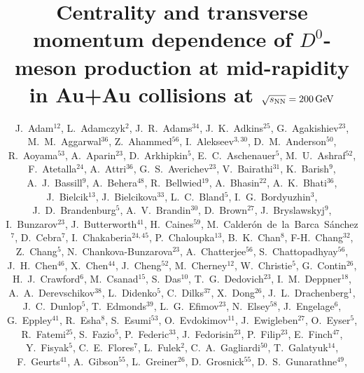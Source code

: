 \documentclass[%
 reprint,	
 amsmath,amssymb,
 aps,
 prc,
]{revtex4-1}
\begin{document}

\title{Centrality and transverse momentum dependence of $D^0$-meson production at mid-rapidity in Au+Au collisions at ${\sqrt{s_{\rm NN}} = \rm{200\,GeV}}$}%



\author{
J.~Adam$^{12}$,
L.~Adamczyk$^{2}$,
J.~R.~Adams$^{34}$,
J.~K.~Adkins$^{25}$,
G.~Agakishiev$^{23}$,
M.~M.~Aggarwal$^{36}$,
Z.~Ahammed$^{56}$,
I.~Alekseev$^{3,30}$,
D.~M.~Anderson$^{50}$,
R.~Aoyama$^{53}$,
A.~Aparin$^{23}$,
D.~Arkhipkin$^{5}$,
E.~C.~Aschenauer$^{5}$,
M.~U.~Ashraf$^{52}$,
F.~Atetalla$^{24}$,
A.~Attri$^{36}$,
G.~S.~Averichev$^{23}$,
V.~Bairathi$^{31}$,
K.~Barish$^{9}$,
A.~J.~Bassill$^{9}$,
A.~Behera$^{48}$,
R.~Bellwied$^{19}$,
A.~Bhasin$^{22}$,
A.~K.~Bhati$^{36}$,
J.~Bielcik$^{13}$,
J.~Bielcikova$^{33}$,
L.~C.~Bland$^{5}$,
I.~G.~Bordyuzhin$^{3}$,
J.~D.~Brandenburg$^{5}$,
A.~V.~Brandin$^{30}$,
D.~Brown$^{27}$,
J.~Bryslawskyj$^{9}$,
I.~Bunzarov$^{23}$,
J.~Butterworth$^{41}$,
H.~Caines$^{59}$,
M.~Calder{\'o}n~de~la~Barca~S{\'a}nchez$^{7}$,
D.~Cebra$^{7}$,
I.~Chakaberia$^{24,45}$,
P.~Chaloupka$^{13}$,
B.~K.~Chan$^{8}$,
F-H.~Chang$^{32}$,
Z.~Chang$^{5}$,
N.~Chankova-Bunzarova$^{23}$,
A.~Chatterjee$^{56}$,
S.~Chattopadhyay$^{56}$,
J.~H.~Chen$^{46}$,
X.~Chen$^{44}$,
J.~Cheng$^{52}$,
M.~Cherney$^{12}$,
W.~Christie$^{5}$,
G.~Contin$^{26}$,
H.~J.~Crawford$^{6}$,
M.~Csanad$^{15}$,
S.~Das$^{10}$,
T.~G.~Dedovich$^{23}$,
I.~M.~Deppner$^{18}$,
A.~A.~Derevschikov$^{38}$,
L.~Didenko$^{5}$,
C.~Dilks$^{37}$,
X.~Dong$^{26}$,
J.~L.~Drachenberg$^{1}$,
J.~C.~Dunlop$^{5}$,
T.~Edmonds$^{39}$,
L.~G.~Efimov$^{23}$,
N.~Elsey$^{58}$,
J.~Engelage$^{6}$,
G.~Eppley$^{41}$,
R.~Esha$^{8}$,
S.~Esumi$^{53}$,
O.~Evdokimov$^{11}$,
J.~Ewigleben$^{27}$,
O.~Eyser$^{5}$,
R.~Fatemi$^{25}$,
S.~Fazio$^{5}$,
P.~Federic$^{33}$,
J.~Fedorisin$^{23}$,
P.~Filip$^{23}$,
E.~Finch$^{47}$,
Y.~Fisyak$^{5}$,
C.~E.~Flores$^{7}$,
L.~Fulek$^{2}$,
C.~A.~Gagliardi$^{50}$,
T.~Galatyuk$^{14}$,
F.~Geurts$^{41}$,
A.~Gibson$^{55}$,
L.~Greiner$^{26}$,
D.~Grosnick$^{55}$,
D.~S.~Gunarathne$^{49}$,
}
\end{document}
